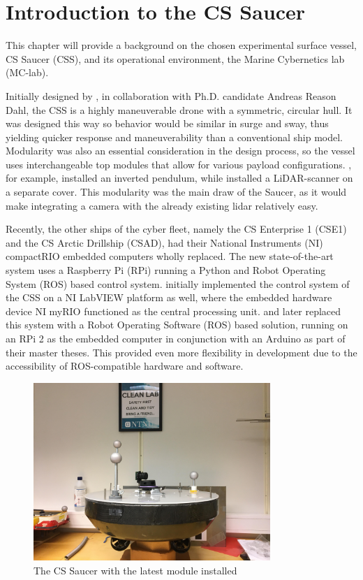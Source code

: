 \chapter{Introduction to the CS Saucer}
\label{chap:Introduction}
This chapter will provide a background on the chosen experimental surface vessel, CS Saucer (CSS), and its operational environment, the Marine Cybernetics lab (MC-lab).

Initially designed by \citet{idland2015marine}, in collaboration with Ph.D. candidate Andreas Reason Dahl, the CSS is a highly maneuverable drone with a symmetric, circular hull. It was designed this way so behavior would be similar in surge and sway, thus yielding quicker response and maneuverability than a conventional ship model. Modularity was also an essential consideration in the design process, so the vessel uses interchangeable top modules that allow for various payload configurations. \citet{sharoni2016marine}, for example, installed an inverted pendulum, while \citet{ueland} installed a LiDAR-scanner on a separate cover. This modularity was the main draw of the Saucer, as it would make integrating a camera with the already existing lidar relatively easy. 

Recently, the other ships of the cyber fleet, namely the CS Enterprise 1 (CSE1) and the CS Arctic Drillship (CSAD), had their National Instruments (NI) compactRIO embedded computers wholly replaced. The new state-of-the-art system uses a Raspberry Pi (RPi) running a Python and Robot Operating System (ROS) based control system. \citet{idland2015marine} initially implemented the control system of the CSS on a NI LabVIEW platform as well, where the embedded hardware device NI myRIO functioned as the central processing unit. \citet{ueland} and \citet{sharoni2016marine} later replaced this system with a Robot Operating Software (ROS) based solution, running on an RPi 2 as the embedded computer in conjunction with an Arduino as part of their master theses. This provided even more flexibility in development due to the accessibility of ROS-compatible hardware and software.

\begin{figure}[ht]
    \centering
    \includegraphics[width=0.8\textwidth]{Images/cssaucer.jpg}
    \caption{The CS Saucer with the latest module installed}
    \label{fig:suacer}
\end{figure}


